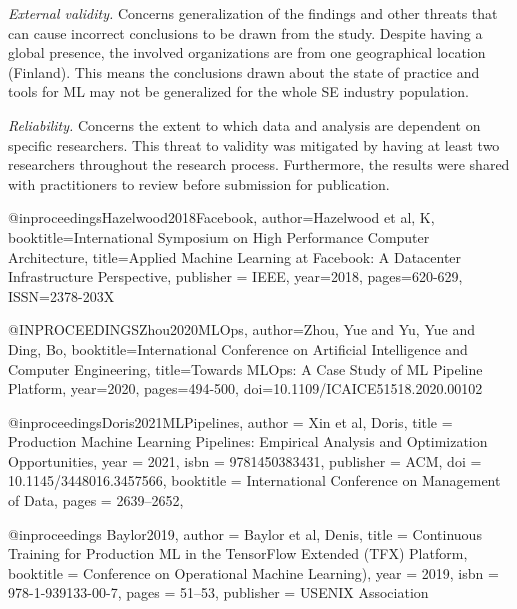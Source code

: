 \documentclass{IEEEcsmag}
\begin{document}
\textit{External validity.} Concerns generalization of the findings and other threats that can cause incorrect conclusions to be drawn from the study. Despite having a global presence, the involved organizations are from one geographical location (Finland). This means the conclusions drawn about the state of practice and tools for ML may not be generalized for the whole SE industry population. 

\textit{Reliability.} Concerns the extent to which data and analysis are dependent on specific researchers. This threat to validity was mitigated by having at least two researchers throughout the research process. Furthermore, the results were shared with practitioners to review before submission for publication.











 









\small
@inproceedings{Hazelwood2018Facebook, 
author={Hazelwood et al, K}, 
booktitle={International Symposium on High Performance Computer Architecture}, 
title={Applied Machine Learning at {F}acebook: A Datacenter Infrastructure Perspective},
publisher = {IEEE},
year={2018}, 
pages={620-629},
ISSN={2378-203X} }

@INPROCEEDINGS{Zhou2020MLOps,
  author={Zhou, Yue and Yu, Yue and Ding, Bo},
  booktitle={International Conference on Artificial Intelligence and Computer Engineering}, 
  title={Towards {MLOp}s: A Case Study of {ML} Pipeline Platform}, 
  year={2020},
  pages={494-500},
  doi={10.1109/ICAICE51518.2020.00102}}

@inproceedings{Doris2021MLPipelines,
author = {Xin et al, Doris},
title = {Production Machine Learning Pipelines: Empirical Analysis and Optimization Opportunities},
year = {2021},
isbn = {9781450383431},
publisher = {ACM},
doi = {10.1145/3448016.3457566},
booktitle = {International Conference on Management of Data},
pages = {2639–2652},
}

@inproceedings {Baylor2019,
author = {Baylor et al, Denis},
title = {Continuous Training for Production {ML} in the TensorFlow Extended ({TFX}) Platform},
booktitle = {Conference on Operational Machine Learning)},
year = {2019},
isbn = {978-1-939133-00-7},
pages = {51--53},
publisher = {{USENIX} Association}
}
\end{document}
